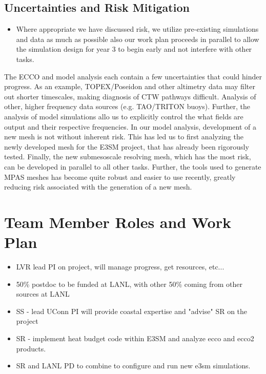 \subsection{Uncertainties and Risk Mitigation}
\color{red}
\begin{itemize}
    \item Where appropriate we have discussed risk, we utilize pre-existing simulations and data as much as possible also our work plan proceeds in parallel to allow the simulation design for year 3 to begin early and not interfere with other tasks.
\end{itemize}
\color{black}

The ECCO and model analysis each contain a few uncertainties that could hinder progress.  As an example, TOPEX/Poseidon and other altimetry data may filter out shorter timescales, making diagnosis of CTW pathways difficult.  Analysis of other, higher frequency data sources (e.g. TAO/TRITON buoys).  Further, the analysis of model simulations allo us to explicitly control the what fields are output and their respective frequencies.  In our model analysis, development of a new mesh is not without inherent risk.  This has led us to first analyzing the newly developed mesh for the E3SM project, that has already been rigorously tested.  Finally, the new submesoscale resolving mesh, which has the most risk, can be developed in parallel to all other tasks.  Further, the tools used to generate MPAS meshes has become quite robust and easier to use recently, greatly reducing risk associated with the generation of a new mesh.

\section{Team Member Roles and Work Plan}

\begin{itemize}
    \item LVR lead PI on project, will manage progress, get resources, etc...
    \item 50\% postdoc to be funded at LANL, with other 50\% coming from other sources at LANL
    \item SS - lead UConn PI will provide coastal expertise and "advise" SR on the project
    \item SR - implement heat budget code within E3SM and analyze ecco and ecco2 products.
    \item SR and LANL PD to combine to configure and run new e3sm simulations.
\end{itemize}

